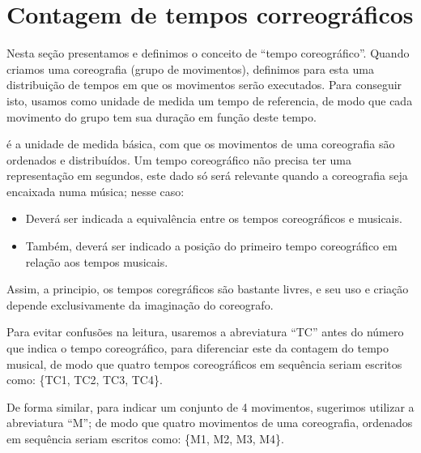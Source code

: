 
\section{Contagem de tempos correográficos}
\label{sec:TemposCoreograficos}
Nesta seção presentamos e definimos o conceito de ``tempo coreográfico''.
Quando criamos uma coreografia (grupo de movimentos), 
definimos para esta uma distribuição de tempos em que os movimentos serão executados.
Para conseguir isto, usamos como unidade de medida um tempo de referencia,
de modo que cada movimento do grupo tem sua duração em função deste tempo.
\begin{definition} 
\label{def:tempocoreografico}
é a unidade de medida básica, com que os movimentos de uma coreografia são ordenados e distribuídos.
Um tempo coreográfico não precisa ter uma representação em segundos,
este dado só será relevante quando a coreografia seja encaixada numa música;
nesse caso: 
\begin{itemize}
\item Deverá ser indicada a equivalência entre os tempos coreográficos e musicais.
\item Também, deverá ser indicado a posição do primeiro tempo coreográfico em relação aos tempos musicais.
\end{itemize}
\end{definition}
Assim, a principio, os tempos coregráficos são bastante livres, 
e seu uso e criação depende exclusivamente da imaginação do coreografo.


Para evitar confusões na leitura, usaremos a abreviatura ``TC'' 
antes do número que indica o tempo coreográfico,
para diferenciar este da contagem do tempo musical,
de modo que quatro tempos coreográficos em sequência seriam escritos como: 
\{TC1, TC2, TC3, TC4\}.

De forma similar, para indicar um conjunto de 4 movimentos, 
sugerimos utilizar a abreviatura ``M''; de modo que quatro movimentos de uma coreografia,
ordenados em sequência seriam escritos como: 
\{M1, M2, M3, M4\}.

